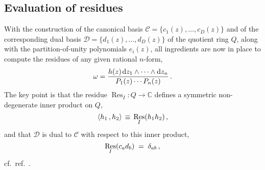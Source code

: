 \documentclass[dvipsnames,preprint,12pt,sort&compress]{elsarticle}
\def\d{{\rm d}}
\begin{document}
\subsection{Evaluation of residues}

With the construction of the canonical basis
$\mathcal{C} = \{ c_1(z), \ldots, c_D (z) \}$ and of the
corresponding dual basis $\mathcal{D} = \{ d_1(z), \ldots, d_D (z) \}$
of the quotient ring $Q$, along with the partition-of-unity polynomials
$e_i (z)$, all ingredients are now in place to compute the residues
of any given rational $n$-form,
\begin{equation}
\omega = \frac{h(z) \hspace{0.4mm} \d z_1 \wedge \cdots \wedge \d z_n}{P_1 (z) \cdots P_n (z)} \,.
\label{eq:diff_form}
\end{equation}
The key point is that the residue $\mathop{\mathrm{Res}}_I : Q \to \mathbb{C}$
defines a symmetric non-degenerate inner product on $Q$,
\begin{equation}
\langle h_1 \,, h_2 \rangle \hspace{0.5mm}\equiv\hspace{0.5mm} \mathop{\mathrm{Res}}_I (h_1 h_2) \,,
\end{equation}
and that $\mathcal{D}$ is dual to $\mathcal{C}$ with respect to this inner product,
\begin{equation}
\mathop{\mathrm{Res}}_I (c_a d_b) \hspace{1mm}=\hspace{1mm} \delta_{a b} \,,
\end{equation}
cf.~ref.~\cite{CattaniDickenstein}.
\end{document}
